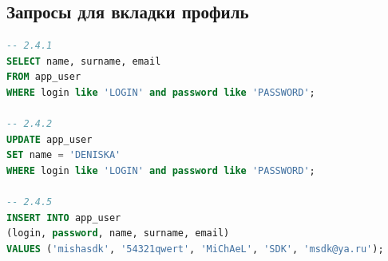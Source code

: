 \documentclass[a4paper,16pt]{article}
\begin{document}
\subsection{Запросы для вкладки профиль}
\begin{lstlisting}[language=SQL]
-- 2.4.1
SELECT name, surname, email
FROM app_user
WHERE login like 'LOGIN' and password like 'PASSWORD';

-- 2.4.2
UPDATE app_user
SET name = 'DENISKA'
WHERE login like 'LOGIN' and password like 'PASSWORD';

-- 2.4.5
INSERT INTO app_user
(login, password, name, surname, email)
VALUES ('mishasdk', '54321qwert', 'MiChAeL', 'SDK', 'msdk@ya.ru');
\end{lstlisting}

                                   

\end{document}
